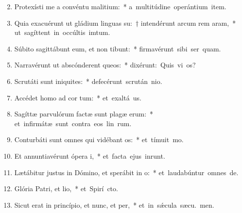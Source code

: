 \begin{flushleft}
\begin{enumerate}[leftmargin=*]
\setcounter{enumi}{1}


\item Protexísti me a convéntu malitium:~* \mbox{a multitúdine operántium item.}
\item Quia exacuérunt ut gládium linguas su:~† intendérunt arcum rem aram,~*  \mbox{ut sagíttent in occúltis imtum.}
\item Súbito sagittábunt eum, et non tibunt:~* \mbox{firmavérunt sibi ser quam.}
\item Narravérunt ut abscónderent queos:~* \mbox{dixérunt: Quis vi os?}
\item Scrutáti sunt iniquites:~* \mbox{defecérunt scrután nio.}
\item Accédet homo ad cor tum:~* \mbox{et exaltá us.}
\item Sagíttæ parvulórum factæ sunt plagæ erum:~* \mbox{et infirmátæ sunt contra eos lin rum.}
\item Conturbáti sunt omnes qui vidébant os:~* \mbox{et tímuit  mo.}
\item Et annuntiavérunt ópera i,~* \mbox{et facta ejus inrunt.}
\item Lætábitur justus in Dómino, et sperábit in o:~* \mbox{et laudabúntur omnes  de.}
\item Glória Patri, et lio,~* \mbox{et Spirí cto.}
\item Sicut erat in princípio, et nunc, et per,~* \mbox{et in s\'{\ae}cula sæcu. men.}

\end{enumerate}
\end{flushleft}

